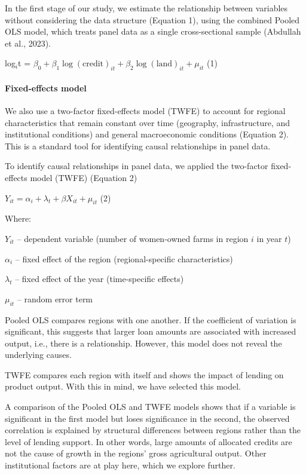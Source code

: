﻿\documentclass[sn-mathphys-num]{sn-jnl}
\newcommand{\hl}[1]{#1}
\begin{document}
In the first stage of our study, we estimate the relationship between
variables without considering the data structure (Equation 1), using the
combined Pooled OLS model, which treats panel data as a single
cross-sectional sample (\hl{Abdullah et al., 2023)}.

log$_i$t = $\beta_0 + \beta_1 \log(\text{credit})_{it} + \beta_2 \log(\text{land})_{it} + \mu_{it}$ (1)

\paragraph{Fixed-effects model}

We also use a two-factor fixed-effects model (TWFE) to account for
regional characteristics that remain constant over time (geography,
infrastructure, and institutional conditions) and general macroeconomic
conditions (Equation 2). This is a standard tool for identifying causal
relationships in panel data.

To identify causal relationships in panel data, we applied the
two-factor fixed-effects model (TWFE) (Equation 2)

$Y_{it} = \alpha_i + \lambda_t + \beta X_{it} + \mu_{it}$ (2)

Where:

$Y_{it}$ -- dependent variable (number of women-owned farms in region $i$ in year $t$)

$\alpha_i$ -- fixed effect of the region (regional-specific characteristics)

$\lambda_t$ -- fixed effect of the year (time-specific effects)

$\mu_{it}$ -- random error term

Pooled OLS compares regions with one another. If the coefficient of
variation is significant, this suggests that larger loan amounts are
associated with increased output, i.e., there is a relationship.
However, this model does not reveal the underlying causes.

TWFE compares each region with itself and shows the impact of lending on
product output. With this in mind, we have selected this model.

A comparison of the Pooled OLS and TWFE models shows that if a variable
is significant in the first model but loses significance in the second,
the observed correlation is explained by structural differences between
regions rather than the level of lending support. In other words, large
amounts of allocated credits are not the cause of growth in the regions'
gross agricultural output. Other institutional factors are at play here,
which we explore further.
\end{document}
